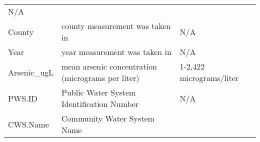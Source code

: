 \documentclass[12pt,]{article}
\begin{document}
\begin{longtable}[]{@{}lll@{}}
\begin{minipage}[t]{0.23\columnwidth}
N/A\strut
\end{minipage}\tabularnewline
\begin{minipage}[t]{0.22\columnwidth}\raggedright
County\strut
\end{minipage} & \begin{minipage}[t]{0.46\columnwidth}\raggedright
county measurement was taken in\strut
\end{minipage} & \begin{minipage}[t]{0.23\columnwidth}\raggedright
N/A\strut
\end{minipage}\tabularnewline
\begin{minipage}[t]{0.22\columnwidth}\raggedright
Year\strut
\end{minipage} & \begin{minipage}[t]{0.46\columnwidth}\raggedright
year measurement was taken in\strut
\end{minipage} & \begin{minipage}[t]{0.23\columnwidth}\raggedright
N/A\strut
\end{minipage}\tabularnewline
\begin{minipage}[t]{0.22\columnwidth}\raggedright
Arsenic\_ugL\strut
\end{minipage} & \begin{minipage}[t]{0.46\columnwidth}\raggedright
mean arsenic concentration (micrograms per liter)\strut
\end{minipage} & \begin{minipage}[t]{0.23\columnwidth}\raggedright
1-2,422 micrograms/liter\strut
\end{minipage}\tabularnewline
\begin{minipage}[t]{0.22\columnwidth}\raggedright
PWS.ID\strut
\end{minipage} & \begin{minipage}[t]{0.46\columnwidth}\raggedright
Public Water System Identification Number\strut
\end{minipage} & \begin{minipage}[t]{0.23\columnwidth}\raggedright
N/A\strut
\end{minipage}\tabularnewline
\begin{minipage}[t]{0.22\columnwidth}\raggedright
CWS.Name\strut
\end{minipage} & \begin{minipage}[t]{0.46\columnwidth}\raggedright
Community Water System Name\strut
\end{minipage} & \begin{minipage}[t]{0.23\columnwidth}\raggedright

\end{minipage}
\end{longtable}
\end{document}
